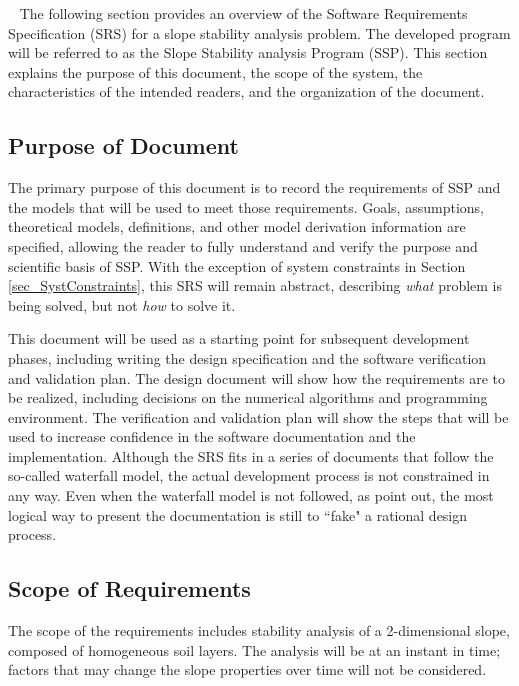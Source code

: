 \documentclass[12pt]{article}
\newcommand{\progname}{SSP}
\begin{document}
~\newline
The following section provides an overview of the Software Requirements 
Specification (SRS) for a slope stability analysis problem. The developed 
program will be referred to as the Slope Stability analysis Program 
(\progname). This section explains the purpose of this document, the 
scope of the system, the characteristics of the intended readers, and the 
organization of the document.

\subsection{Purpose of Document}

The primary purpose of this document is to record the requirements of  
\progname{} and the models that will be used to meet those requirements. Goals, 
 assumptions,  theoretical models, definitions, and other model derivation 
 information are specified, allowing the reader to fully understand and verify 
 the purpose and scientific basis of \progname. With the exception of system 
 constraints in Section \ref{sec_SystConstraints}, this SRS will remain 
 abstract, describing \textit{what} problem is being solved, but not 
 \textit{how} to solve it.
~\newline

\noindent This document will be used as a starting point for subsequent 
development 
phases, including writing the design specification and the software verification
 and validation plan. The design document will show how the requirements
 are to be realized, including decisions on the numerical algorithms and 
programming environment. The verification and validation plan will show
 the steps that will be used to increase confidence in the software 
 documentation
 and the implementation. Although the SRS fits in a series of documents 
that follow the so-called waterfall model, the actual development process
 is not constrained in any way. Even when the waterfall model is not followed, 
as \cite{ParnasAndClements1986} point out, the most logical 
way to present the documentation is still to ``fake" a rational design process.

\subsection{Scope of Requirements} 

The scope of the requirements includes stability analysis of a 2-dimensional 
slope, composed of homogeneous soil layers. The analysis will be at an instant 
in time; factors that may change the slope properties over time will not be 
considered.
\end{document}
